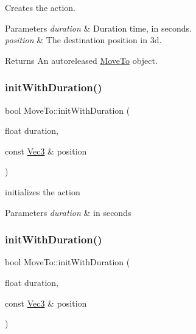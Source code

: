 Creates the action. 
\begin{DoxyParams}{Parameters}
{\em duration} & Duration time, in seconds. \\
\hline
{\em position} & The destination position in 3d. \\
\hline
\end{DoxyParams}
\begin{DoxyReturn}{Returns}
An autoreleased \hyperlink{classMoveTo}{Move\+To} object. 
\end{DoxyReturn}
\mbox{\label{classMoveTo_acc1190010eef055d34d62e37ac242043}} 
\subsubsection{\texorpdfstring{init\+With\+Duration()}{initWithDuration()}\hspace{0.1cm}{\footnotesize\ttfamily [1/2]}}
{\footnotesize\ttfamily bool Move\+To\+::init\+With\+Duration (\begin{DoxyParamCaption}\item[{float}]{duration,  }\item[{const \hyperlink{classVec3}{Vec3} \&}]{position }\end{DoxyParamCaption})}

initializes the action 
\begin{DoxyParams}{Parameters}
{\em duration} & in seconds \\
\hline
\end{DoxyParams}
\mbox{\label{classMoveTo_acc1190010eef055d34d62e37ac242043}} 
\subsubsection{\texorpdfstring{init\+With\+Duration()}{initWithDuration()}\hspace{0.1cm}{\footnotesize\ttfamily [2/2]}}
{\footnotesize\ttfamily bool Move\+To\+::init\+With\+Duration (\begin{DoxyParamCaption}\item[{float}]{duration,  }\item[{const \hyperlink{classVec3}{Vec3} \&}]{position }\end{DoxyParamCaption})}

